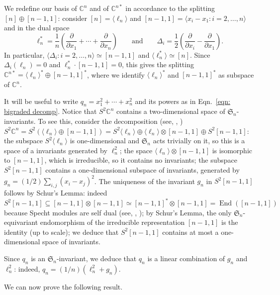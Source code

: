 \documentclass{toc}
\newcommand{\vvirg}{ , \dots , }
\newcommand{\bbC}{\mathbb{C}}
\newcommand{\frakS}{\mathfrak{S}}
\DeclareMathOperator{\End}{End}
\begin{document}
We redefine our basis of $\bbC^n$ and of $\bbC^{n*}$ in accordance to the splitting $[n] \oplus [n-1,1]$: consider $[n] = \langle \ell_n\rangle$ and $[n-1,1] = \langle x_i - x_1 : i = 2 \vvirg n\rangle$ and in the dual space
\[
  \ell_n^* = \frac{1}{n} \left(\frac{\partial }{\partial x_1 } + \cdots + \frac{\partial }{\partial x_n } \right)\qquad\text{and}\qquad \Delta_{i} = \frac{1}{2} \left(\frac{\partial}{\partial x_i} -\frac{\partial}{\partial x_1}\right).
\]
In particular,
$\langle \Delta_i : i = 2 \vvirg n\rangle \simeq [n-1,1]$ and
$\langle \ell_n^* \rangle \simeq [n]$. Since $\Delta_i ( \ell_n ) = 0$
and $\ell_n^* \cdot [n-1,1] = 0$, this gives the splitting
$\bbC^{n*} = \langle \ell_n \rangle ^* \oplus [n-1,1]^*$, where we
identify $\langle \ell_n \rangle ^*$ and $[n-1,1]^*$ as subspace of
$\bbC^n$.
 

\begin{remark}\label{rmk: write q as ell plus g}
  It will be useful to write $q_n = x_1 ^2 + \cdots + x_n^2$ and its powers as in Eqn.~\eqref{eqn: bigraded decomp}. Notice that $S^2 \bbC^n$ contains a two-dimensional space of $\frakS_n$-invariants. To see this, consider the decomposition
(see, \eg, \cite[Eqn.~(6.7.1)]{Lan:TensorBook}) $S^2 \bbC^n = S^2 (\langle \ell_n\rangle \oplus [n-1,1] ) = S^2 \langle \ell_n \rangle \oplus \langle \ell_n \rangle \otimes [n-1,1] \oplus S^2 [n-1,1]$:  the subspace $S^2 \langle \ell_n \rangle$ is one-dimensional and $\frakS_n$ acts trivially on it, so this is a space of a invariants generated by $\ell_n^2$; the space $ \langle \ell_n \rangle \otimes [n-1,1]$ is isomorphic to $[n-1,1]$, which is irreducible, so it contains no invariants; the subspace $ S^2 [n-1,1]$ contains a one-dimensional subspace of invariants, generated by $g_n = ({1}/{2})\sum_{i,j} (x_i - x_j)^2$. The uniqueness of the invariant $g_n$ in $S^2 [n-1,1]$ follows by Schur's Lemma: indeed $S^2 [n-1,1] \subseteq [n-1,1] \otimes [n-1,1] \simeq [n-1,1]^* \otimes [n-1,1] = \End ([n-1,1])$ because 
Specht modules are self dual (see, \eg, \cite[Ch. 4]{FulHar:RepTh}); by Schur's Lemma, the only $\frakS_n$-equivariant endomorphism of the irreducible representation $[n-1,1]$ is the identity (up to scale); we deduce that $S^2 [n-1,1]$ contains at most a one-dimensional space of invariants.

Since $q_n$ is an $\frakS_n$-invariant, we deduce that $q_n$ is a linear combination of $g_n$ and $\ell_n^2$: indeed, $q_n = ({1}/{n})( \ell_n^2 + g_n)$.
\end{remark}

We can now prove the following result. 
\end{document}
